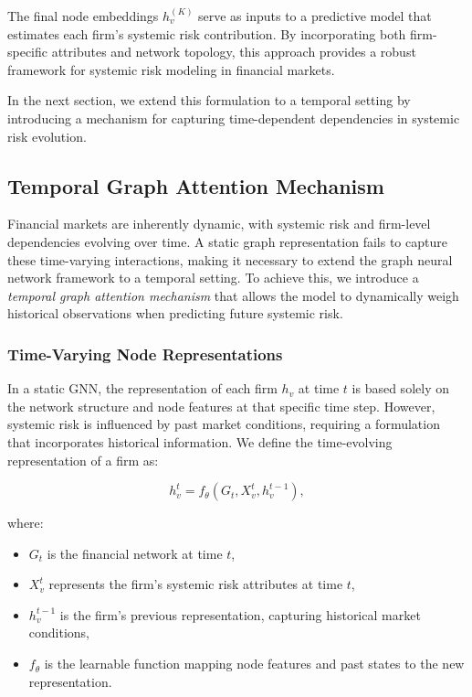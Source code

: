 \documentclass[preprint,12pt,authoryear]{elsarticle}
\begin{document}
The final node embeddings \( h_v^{(K)} \) serve as inputs to a predictive model that estimates each firm's systemic risk contribution. By incorporating both firm-specific attributes and network topology, this approach provides a robust framework for systemic risk modeling in financial markets.

In the next section, we extend this formulation to a temporal setting by introducing a mechanism for capturing time-dependent dependencies in systemic risk evolution.

\subsection{Temporal Graph Attention Mechanism}  

Financial markets are inherently dynamic, with systemic risk and firm-level dependencies evolving over time. A static graph representation fails to capture these time-varying interactions, making it necessary to extend the graph neural network framework to a temporal setting. To achieve this, we introduce a \textit{temporal graph attention mechanism} that allows the model to dynamically weigh historical observations when predicting future systemic risk.  

\subsubsection{Time-Varying Node Representations}  

In a static GNN, the representation of each firm \( h_v \) at time \( t \) is based solely on the network structure and node features at that specific time step. However, systemic risk is influenced by past market conditions, requiring a formulation that incorporates historical information. We define the time-evolving representation of a firm as:

\[
h_v^t = f_{\theta}(G_t, X_v^t, h_v^{t-1}),
\]

where:
\begin{itemize}
    \item \( G_t \) is the financial network at time \( t \),
    \item \( X_v^t \) represents the firm’s systemic risk attributes at time \( t \),
    \item \( h_v^{t-1} \) is the firm’s previous representation, capturing historical market conditions,
    \item \( f_{\theta} \) is the learnable function mapping node features and past states to the new representation.
\end{itemize}
\end{document}
